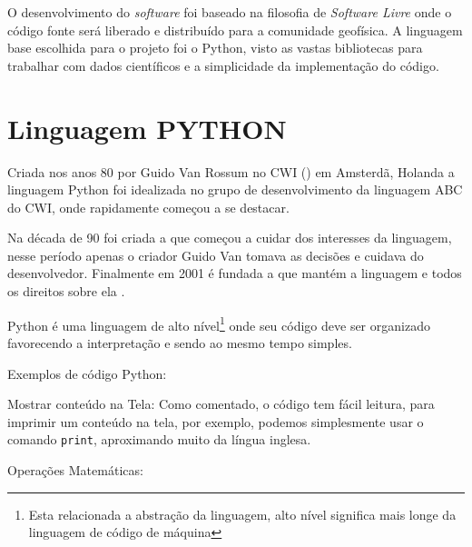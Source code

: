         O desenvolvimento do \textit{software} foi baseado na filosofia de \textit{Software Livre} \cite{soft_free} onde o código fonte será liberado e distribuído para a comunidade geofísica. A linguagem base escolhida para o projeto foi o Python, visto as vastas bibliotecas para trabalhar com dados científicos e a simplicidade da implementação do código.  
        
        \section{Linguagem PYTHON}
            \label{lim_python}
            
            Criada nos anos 80 por Guido Van Rossum no CWI () em Amsterdã, Holanda a linguagem Python foi idealizada no grupo de desenvolvimento da linguagem ABC do CWI, onde rapidamente começou a se destacar.
            
            Na década de 90 foi criada a  que começou a cuidar dos interesses da linguagem, nesse período apenas o criador Guido Van tomava as decisões e cuidava do desenvolvedor. Finalmente em 2001 é fundada a  que mantém a linguagem e todos os direitos sobre ela \cite{python36}.  
            
            Python é uma linguagem de alto nível\footnote{Esta relacionada a abstração da linguagem, alto nível significa mais longe da linguagem de código de máquina} onde seu código deve ser organizado favorecendo a interpretação e sendo ao mesmo tempo simples.
            
            Exemplos de código Python:

            Mostrar conteúdo na Tela:
            Como comentado, o código tem fácil leitura, para imprimir um conteúdo na tela, por exemplo, 
            podemos simplesmente usar o comando \verb|print|, aproximando muito da língua inglesa.  
            \begin{quote}
                                                       

            \end{quote}
            
            Operações Matemáticas:
            
